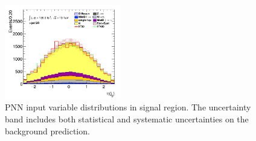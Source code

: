 \begin{figure}[!htp]
\begin{center}
			\includegraphics[width=0.45\textwidth]{chapters/chapter6_HPlus/images/taujets/jet_0_eta_SR_TAUJET.png} 
			\end{center}
			\caption{
			PNN input variable distributions in \taujets signal region. The uncertainty band includes both statistical and systematic uncertainties on the background prediction. 
			}
			\label{fig:sr-taujets-2}
		\end{figure}

